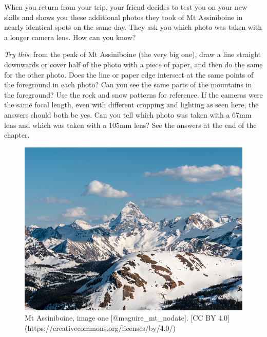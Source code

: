 \documentclass[
]{book}
\begin{document}
When you return from your trip, your friend decides to test you on your new skills and shows you these additional photos they took of Mt Assiniboine in nearly identical spots on the same day. They ask you which photo was taken with a longer camera lens. How can you know?

\emph{Try this}: from the peak of Mt Assiniboine (the very big one), draw a line straight downwards or cover half of the photo with a piece of paper, and then do the same for the other photo. Does the line or paper edge intersect at the same points of the foreground in each photo? Can you see the same parts of the mountains in the foreground? Use the rock and snow patterns for reference. If the cameras were the same focal length, even with different cropping and lighting as seen here, the answers should both be yes. Can you tell which photo was taken with a 67mm lens and which was taken with a 105mm lens? See the answers at the end of the chapter.

\begin{figure}
\includegraphics[width=0.9\linewidth]{images/12-assiniboine_day} \caption{Mt Assiniboine, image one [@maguire_mt_nodate]. [CC BY 4.0](https://creativecommons.org/licenses/by/4.0/)}\label{fig:12-assiniboine-day}
\end{figure}
\end{document}

